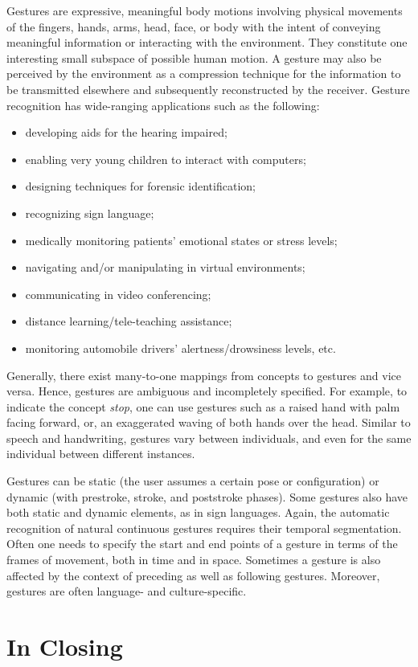 Gestures are expressive, meaningful body motions involving physical movements of the fingers, hands, arms, head, face, or
body with the intent of conveying meaningful information or interacting with the environment. They constitute one interesting
small subspace of possible human motion. A gesture may also be perceived by the environment as a compression technique for the information to be transmitted elsewhere and subsequently reconstructed by the receiver. Gesture recognition has wide-ranging applications such as the following:
\begin{itemize}
\item developing aids for the hearing impaired;
\item  enabling very young children to interact with computers;
\item  designing techniques for forensic identification;
\item recognizing sign language;
\item medically monitoring patients’ emotional states or stress
levels;
\item navigating and/or manipulating in virtual environments;
\item communicating in video conferencing;
\item distance learning/tele-teaching assistance;
\item monitoring automobile drivers' alertness/drowsiness
levels, etc.
\end{itemize}

Generally, there exist many-to-one mappings from concepts
to gestures and vice versa. Hence, gestures are ambiguous and
incompletely specified. For example, to indicate the concept
\textit{stop}, one can use gestures such as a raised hand with palm
facing forward, or, an exaggerated waving of both hands over the
head. Similar to speech and handwriting, gestures vary between
individuals, and even for the same individual between different
instances.

Gestures can be static (the user assumes a certain pose or configuration)
or dynamic (with prestroke, stroke, and poststroke
phases). Some gestures also have both static and dynamic elements,
as in sign languages. Again, the automatic recognition
of natural continuous gestures requires their temporal segmentation.
Often one needs to specify the start and end points of a
gesture in terms of the frames of movement, both in time and
in space. Sometimes a gesture is also affected by the context of
preceding as well as following gestures. Moreover, gestures are
often language- and culture-specific.


\section{In Closing}
